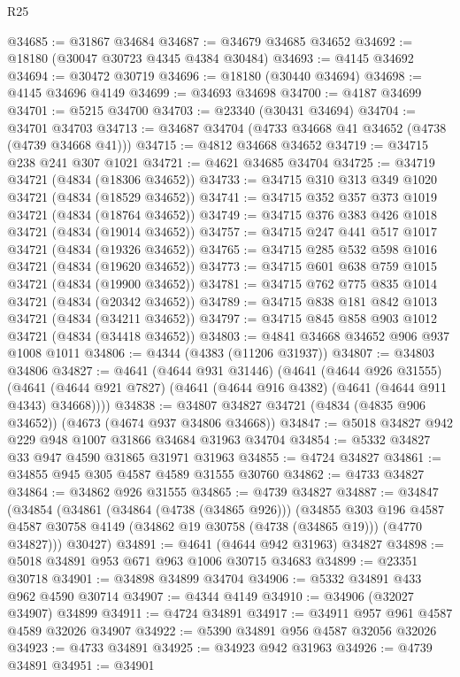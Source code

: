 \begin{lexlean}{R25}
\begin{coremodule}
@34685 := @31867 @34684
@34687 := @34679 @34685 @34652
@34692 := @18180 (@30047 @30723 @4345 @4384 @30484)
@34693 := @4145 @34692
@34694 := @30472 @30719
@34696 := @18180 (@30440 @34694)
@34698 := @4145 @34696 @4149
@34699 := @34693 @34698
@34700 := @4187 @34699
@34701 := @5215 @34700
@34703 := @23340 (@30431 @34694)
@34704 := @34701 @34703
@34713 := @34687 @34704 (@4733 @34668 @41 @34652 (@4738 (@4739 @34668 @41)))
@34715 := @4812 @34668 @34652
@34719 := @34715 @238 @241 @307 @1021
@34721 := @4621 @34685 @34704
@34725 := @34719 @34721 (@4834 (@18306 @34652))
@34733 := @34715 @310 @313 @349 @1020 @34721 (@4834 (@18529 @34652))
@34741 := @34715 @352 @357 @373 @1019 @34721 (@4834 (@18764 @34652))
@34749 := @34715 @376 @383 @426 @1018 @34721 (@4834 (@19014 @34652))
@34757 := @34715 @247 @441 @517 @1017 @34721 (@4834 (@19326 @34652))
@34765 := @34715 @285 @532 @598 @1016 @34721 (@4834 (@19620 @34652))
@34773 := @34715 @601 @638 @759 @1015 @34721 (@4834 (@19900 @34652))
@34781 := @34715 @762 @775 @835 @1014 @34721 (@4834 (@20342 @34652))
@34789 := @34715 @838 @181 @842 @1013 @34721 (@4834 (@34211 @34652))
@34797 := @34715 @845 @858 @903 @1012 @34721 (@4834 (@34418 @34652))
@34803 := @4841 @34668 @34652 @906 @937 @1008 @1011
@34806 := @4344 (@4383 (@11206 @31937))
@34807 := @34803 @34806
@34827 := @4641
    (@4644 @931 @31446)
    (@4641
      (@4644 @926 @31555)
      (@4641 (@4644 @921 @7827) (@4641 (@4644 @916 @4382) (@4641 (@4644 @911 @4343) @34668))))
@34838 := @34807 @34827 @34721 (@4834 (@4835 @906 @34652)) (@4673 (@4674 @937 @34806 @34668))
@34847 := @5018 @34827 @942 @229 @948 @1007 @31866 @34684 @31963 @34704
@34854 := @5332 @34827 @33 @947 @4590 @31865 @31971 @31963
@34855 := @4724 @34827
@34861 := @34855 @945 @305 @4587 @4589 @31555 @30760
@34862 := @4733 @34827
@34864 := @34862 @926 @31555
@34865 := @4739 @34827
@34887 := @34847
    (@34854
      (@34861
        (@34864 (@4738 (@34865 @926)))
        (@34855
          @303
          @196
          @4587
          @4587
          @30758
          @4149
          (@34862 @19 @30758 (@4738 (@34865 @19)))
          (@4770 @34827)))
      @30427)
@34891 := @4641 (@4644 @942 @31963) @34827
@34898 := @5018 @34891 @953 @671 @963 @1006 @30715 @34683
@34899 := @23351 @30718
@34901 := @34898 @34899 @34704
@34906 := @5332 @34891 @433 @962 @4590 @30714
@34907 := @4344 @4149
@34910 := @34906 (@32027 @34907) @34899
@34911 := @4724 @34891
@34917 := @34911 @957 @961 @4587 @4589 @32026 @34907
@34922 := @5390 @34891 @956 @4587 @32056 @32026
@34923 := @4733 @34891
@34925 := @34923 @942 @31963
@34926 := @4739 @34891
@34951 := @34901

\end{coremodule}
\end{lexlean}
